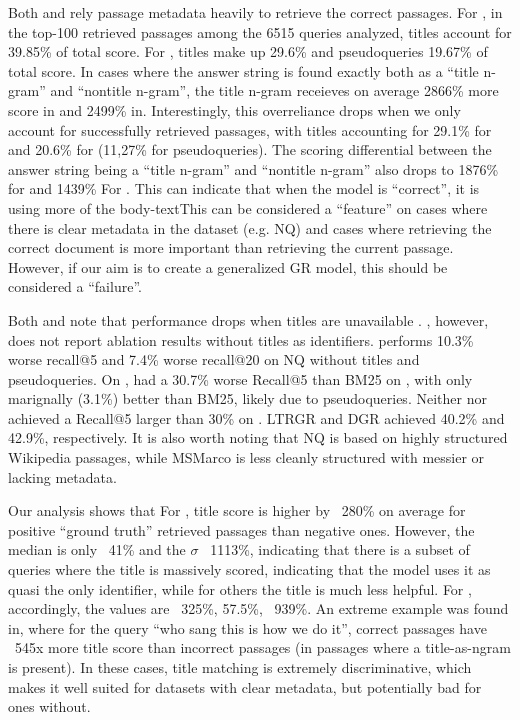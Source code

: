 Both  and  rely passage metadata heavily to retrieve the correct passages. For , in the top-100 retrieved passages among the 6515 queries analyzed, titles account for 39.85\% of total score. For , titles make up  29.6\% and pseudoqueries 19.67\% of total score. In cases where the answer string is found exactly both as a ``title n-gram'' and ``nontitle n-gram'', the title n-gram receieves on average 2866\% more score in  and 2499\% in. Interestingly, this overreliance drops when we only account for successfully retrieved passages, with titles accounting for 29.1\% for  and 20.6\% for (11,27\% for pseudoqueries). The scoring differential between the answer string being a ``title n-gram'' and ``nontitle n-gram'' also drops to 1876\% for  and 1439\% For . This can indicate that when the model is ``correct'', it is using more of the body-textThis can be considered a ``feature'' on cases where there is clear metadata in the dataset (e.g. NQ) and cases where retrieving the correct document is more important than retrieving the current passage. However, if our aim is to create a generalized GR model, this should be considered a ``failure''.

Both \citet{michele-bevilacqua-autoregressive-search} and \citet{yongqi-li-multiview-identifiers,yongqi-li-learning-to,li-distillation-enhanced} note that performance drops when titles are unavailable \cite{michele-bevilacqua-autoregressive-search,yongqi-li-multiview-identifiers,yongqi-li-learning-to,li-distillation-enhanced}. \citet{michele-bevilacqua-autoregressive-search}, however, does not report  ablation results without titles as identifiers. performs 10.3\% worse recall@5 and 7.4\% worse recall@20 on NQ without titles and pseudoqueries. On  \cite{payal-bajaj-ms-marco},  had a 30.7\% worse Recall@5 than BM25 on , with  only marignally (3.1\%) better than BM25, likely due to pseudoqueries. Neither nor  achieved a Recall@5 larger than 30\% on . LTRGR and DGR achieved 40.2\% and 42.9\%, respectively. It is also worth noting that NQ is based on highly structured Wikipedia passages, while MSMarco is less cleanly structured with messier or lacking metadata.

Our analysis shows that For , title score is higher by ~280\% on average for positive ``ground truth'' retrieved passages than negative ones. However, the median is only ~41\% and the $\sigma$ ~1113\%, indicating that there is a subset of queries where the title is massively scored, indicating that the model uses it as quasi the only identifier, while for others the title is much less helpful. For , accordingly, the values are ~325\%, 57.5\%, ~939\%. An extreme example was found in, where for the query ``who sang this is how we do it'', correct passages have ~545x more title score than incorrect passages (in passages where a title-as-ngram is present). In these cases, title matching is extremely discriminative, which makes it well suited for datasets with clear metadata, but potentially bad for ones without.


